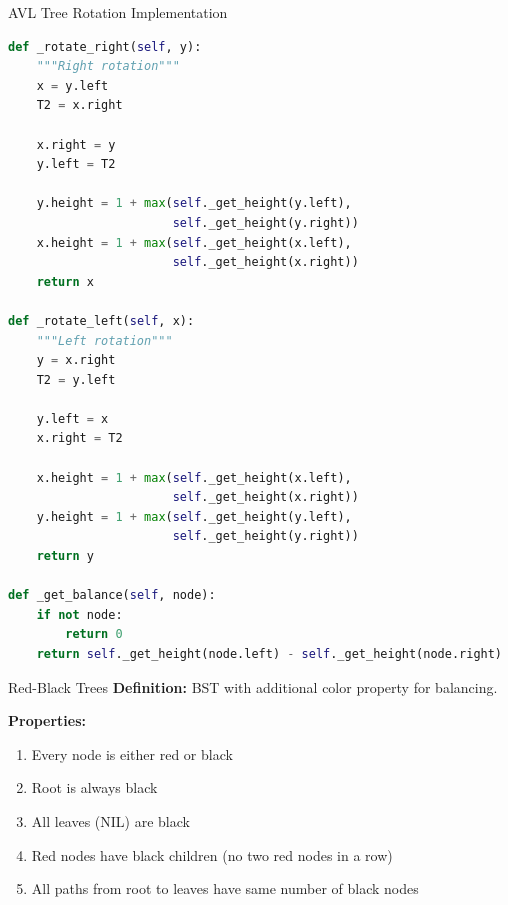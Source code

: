 \documentclass[aspectratio=169]{beamer}
\begin{document}
\begin{frame}[fragile]{AVL Tree Rotation Implementation}
  \begin{lstlisting}[language=Python, basicstyle=\ttfamily\footnotesize]
def _rotate_right(self, y):
    """Right rotation"""
    x = y.left
    T2 = x.right

    x.right = y
    y.left = T2

    y.height = 1 + max(self._get_height(y.left),
                       self._get_height(y.right))
    x.height = 1 + max(self._get_height(x.left),
                       self._get_height(x.right))
    return x

def _rotate_left(self, x):
    """Left rotation"""
    y = x.right
    T2 = y.left

    y.left = x
    x.right = T2

    x.height = 1 + max(self._get_height(x.left),
                       self._get_height(x.right))
    y.height = 1 + max(self._get_height(y.left),
                       self._get_height(y.right))
    return y

def _get_balance(self, node):
    if not node:
        return 0
    return self._get_height(node.left) - self._get_height(node.right)
  \end{lstlisting}
\end{frame}

\begin{frame}{Red-Black Trees}
  \textbf{Definition:} BST with additional color property for balancing.

  \vspace{0.3cm}
  \textbf{Properties:}
  \begin{enumerate}
    \item Every node is either red or black
    \item Root is always black
    \item All leaves (NIL) are black
    \item Red nodes have black children (no two red nodes in a row)
    \item All paths from root to leaves have same number of black nodes
  \end{enumerate}

  \vspace{0.3cm}
  \begin{center}
  \end{center}
\end{frame}
\end{document}
